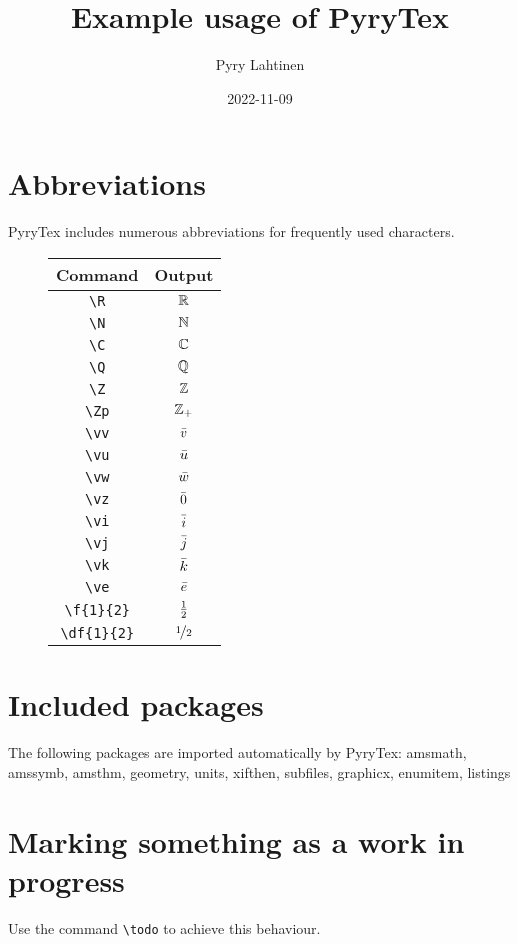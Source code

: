 \documentclass[11pt,a4paper]{article}
\title{Example usage of PyryTex}
\author{Pyry Lahtinen}
\date{2022-11-09}
\begin{document}
\maketitle

\section{Abbreviations}
PyryTex includes numerous abbreviations for frequently used characters.

\begin{figure}[h]
    \centering\begin{tabular}{c|c}
        Command & Output \\
        \hline
        \verb!\R! & $\mathbb R$ \\
        \verb!\N! & $\mathbb N$ \\
        \verb!\C! & $\mathbb C$ \\
        \verb!\Q! & $\mathbb Q$ \\
        \verb!\Z! & $\mathbb Z$ \\
        \verb!\Zp! & $\mathbb Z_+$ \\
        \verb!\vv! & $\bar v$ \\
        \verb!\vu! & $\bar u$ \\
        \verb!\vw! & $\bar w$ \\
        \verb!\vz! & $\bar 0$ \\
        \verb!\vi! & $\bar i$ \\
        \verb!\vj! & $\bar j$ \\
        \verb!\vk! & $\bar k$ \\
        \verb!\ve! & $\bar e$ \\
        \verb!\f{1}{2}! & $\frac{1}{2}$ \\
        \verb!\df{1}{2}! & $\nicefrac{1}{2}$
    \end{tabular}
\end{figure}

\section{Included packages}
The following packages are imported automatically by PyryTex:
amsmath, amssymb, amsthm, geometry, units, xifthen, subfiles, graphicx, enumitem, listings

\section{Marking something as a work in progress}
Use the command \verb!\todo! to achieve this behaviour.
\end{document}
